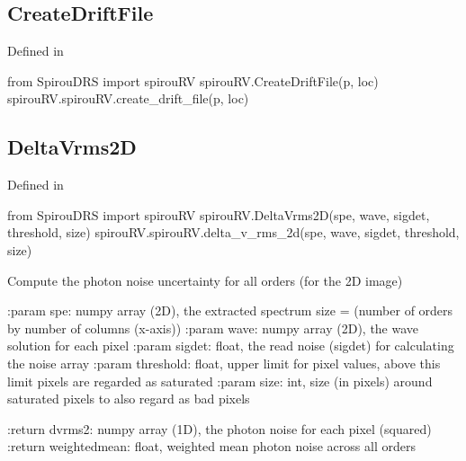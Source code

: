 \begin{minipage}{\textwidth}
\subsection{CreateDriftFile}

Defined in \spirouRV{}

\begin{pythonbox}
from SpirouDRS import spirouRV
spirouRV.CreateDriftFile(p, loc)
spirouRV.spirouRV.create_drift_file(p, loc)
\end{pythonbox}

\begin{pythondocstring}

\end{pythondocstring}
\end{minipage}

\begin{minipage}{\textwidth}
\subsection{DeltaVrms2D}

Defined in \spirouRV{}

\begin{pythonbox}
from SpirouDRS import spirouRV
spirouRV.DeltaVrms2D(spe, wave, sigdet, threshold, size)
spirouRV.spirouRV.delta_v_rms_2d(spe, wave, sigdet, threshold, size)
\end{pythonbox}

\begin{pythondocstring}
Compute the photon noise uncertainty for all orders (for the 2D image)

:param spe: numpy array (2D), the extracted spectrum
            size = (number of orders by number of columns (x-axis))
:param wave: numpy array (2D), the wave solution for each pixel
:param sigdet: float, the read noise (sigdet) for calculating the
               noise array
:param threshold: float, upper limit for pixel values, above this limit
                  pixels are regarded as saturated
:param size: int, size (in pixels) around saturated pixels to also regard
             as bad pixels

:return dvrms2: numpy array (1D), the photon noise for each pixel (squared)
:return weightedmean: float, weighted mean photon noise across all orders
\end{pythondocstring}
\end{minipage}

